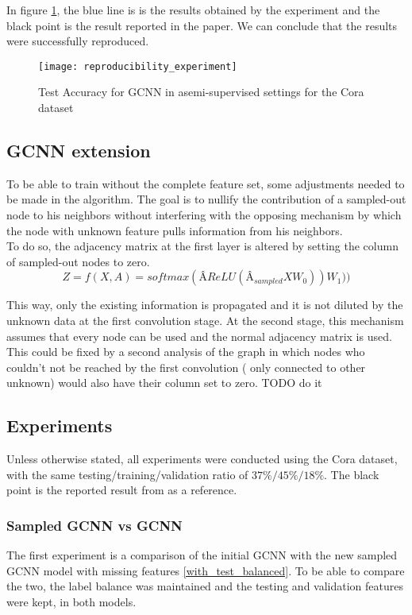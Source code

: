 \documentclass{article}
\begin{document}
In figure \ref{repro}, the blue line is is the results obtained by the experiment and the black point is the result reported in the paper. We can conclude that the results were successfully reproduced.

\begin{figure}[h]
\centering
\texttt{[image: reproducibility\_experiment]}
\caption{Test Accuracy for GCNN in asemi-supervised settings for the Cora dataset}
\label{repro}
\end{figure}
\subsection*{GCNN extension}
To be able to train without the complete feature set, some adjustments needed to be made in the algorithm. The goal is to nullify the contribution of a sampled-out node to his neighbors without interfering with the opposing mechanism by which the node with unknown feature pulls information from his neighbors.
\\
To do so, the adjacency matrix at the first layer is altered by setting the column of sampled-out nodes to zero.
\begin{equation}
Z = f(X, A) = softmax(\text{\^{A}} ReLU(\text{\^{A}}_{sampled}XW_0))W_1))
\end{equation}

This way, only the existing information is propagated and it is not diluted by the unknown data at the first convolution stage. At the second stage, this mechanism assumes that every node can be used and the normal adjacency matrix is used. %
\\This could be fixed by a second analysis of the graph in which nodes who %
 couldn't not be reached by the first convolution (%
 only connected to other unknown) would %
  also have their column set to zero.
TODO do it
\subsection*{Experiments}
Unless otherwise stated, all experiments were conducted using the Cora dataset, with the same testing/training/validation ratio of $37\%/45\%/18\%$. The black point is the reported result from \citeauthor{kipf2017semi} as a reference.
\subsubsection*{Sampled GCNN vs GCNN}
The first experiment is a comparison of the initial GCNN with the new sampled GCNN model with missing features \ref{with_test_balanced}.
 To be able to compare the two, the label balance was maintained and the testing and validation features were kept, in both models.
\end{document}

